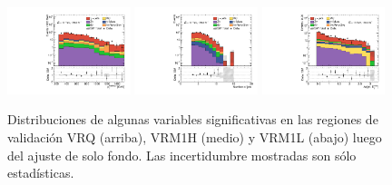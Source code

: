 \begin{figure}[ht!]
\begin{center}
    \includegraphics[width=0.32\textwidth]{images/results/fr2_unblind/can_VRM1H_ph_pt0_afterFit.pdf}
    \includegraphics[width=0.32\textwidth]{images/results/fr2_unblind/can_VRM1H_jet_n_afterFit.pdf}
    \includegraphics[width=0.32\textwidth]{images/results/fr2_unblind/can_VRM1H_dphi_jetmet_afterFit.pdf}

    
    \caption{Distribuciones de algunas variables significativas en las regiones de validación VRQ (arriba), VRM1H (medio) y VRM1L (abajo) luego del ajuste de solo fondo. Las incertidumbre mostradas son sólo estadísticas.}
    \label{fig:dist_vrqm_bkgonly}
  \end{center}
\end{figure}

